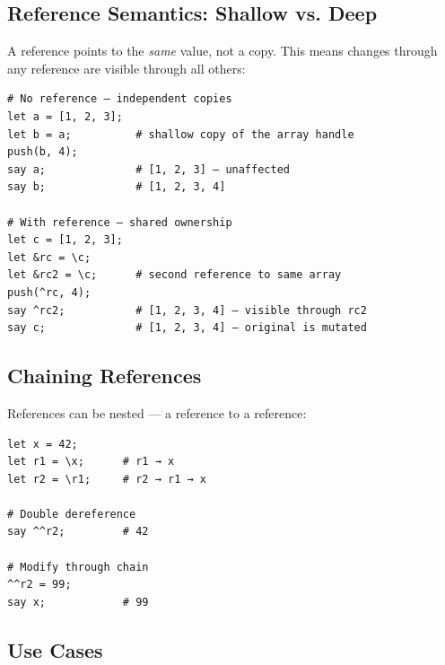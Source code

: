 \subsection{Reference Semantics: Shallow vs. Deep}

A reference points to the \textit{same} value, not a copy. This means changes through any reference are visible through all others:

\begin{tcolorbox}[colback=codebg, colframe=darkpurple, colbacktitle=darkpurple, title=\textbf{\textcolor{codegold}{Reference Semantics}}, fonttitle=\bfseries, sharp corners]
\begin{lstlisting}
# No reference — independent copies
let a = [1, 2, 3];
let b = a;          # shallow copy of the array handle
push(b, 4);
say a;              # [1, 2, 3] — unaffected
say b;              # [1, 2, 3, 4]

# With reference — shared ownership
let c = [1, 2, 3];
let &rc = \c;
let &rc2 = \c;      # second reference to same array
push(^rc, 4);
say ^rc2;           # [1, 2, 3, 4] — visible through rc2
say c;              # [1, 2, 3, 4] — original is mutated
\end{lstlisting}
\end{tcolorbox}

\subsection{Chaining References}

References can be nested — a reference to a reference:

\begin{tcolorbox}[colback=codebg, colframe=darkpurple, colbacktitle=darkpurple, title=\textbf{\textcolor{codegold}{Chained References}}, fonttitle=\bfseries, sharp corners]
\begin{lstlisting}
let x = 42;
let r1 = \x;      # r1 → x
let r2 = \r1;     # r2 → r1 → x

# Double dereference
say ^^r2;         # 42

# Modify through chain
^^r2 = 99;
say x;            # 99
\end{lstlisting}
\end{tcolorbox}

\subsection{Use Cases}

